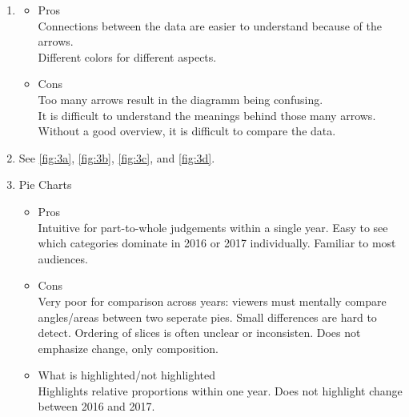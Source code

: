     \begin{exercise} \hfill
        \begin{enumerate}
            \item[a)]
                \begin{itemize}
                    \item Pros \\
                    Connections between the data are easier to understand because of the arrows. \\
                    Different colors for different aspects. \\
                    
                    \item Cons \\
                    Too many arrows result in the diagramm being confusing. \\
                    It is difficult to understand the meanings behind those many arrows. \\
                    Without a good overview, it is difficult to compare the data. \\
                \end{itemize}
            \item[c)] See \autoref{fig:3a}, \autoref{fig:3b}, \autoref{fig:3c}, and \autoref{fig:3d}.
            \item[d)]
                Pie Charts
                \begin{itemize}

                    \item Pros \\
                    Intuitive for part-to-whole judgements within a single year.
                    Easy to see which categories dominate in 2016 or 2017 individually.
                    Familiar to most audiences. 

                    \item Cons \\
                    Very poor for comparison across years: viewers must mentally compare angles/areas between two seperate pies.
                    Small differences are hard to detect.
                    Ordering of slices is often unclear or inconsisten.
                    Does not emphasize change, only composition. 

                    \item What is highlighted/not highlighted \\
                    Highlights relative proportions within one year.
                    Does not highlight change between 2016 and 2017.
                    

\end{itemize}
\end{enumerate}
\end{exercise}
